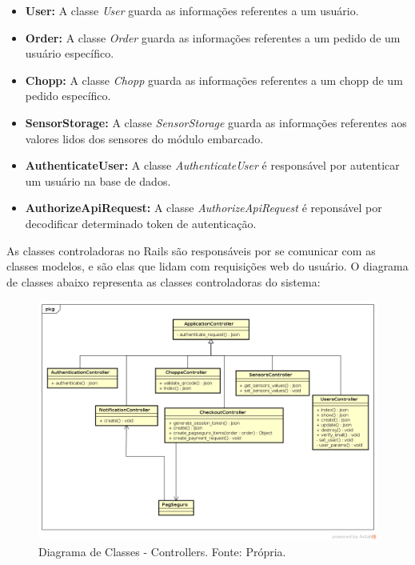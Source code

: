\begin{itemize}
    \item \textbf{User:} A classe \textit{User} guarda as informações referentes a um usuário.
    \item \textbf{Order:} A classe \textit{Order} guarda as informações referentes a um pedido
    de um usuário específico. 
    \item \textbf{Chopp:} A classe \textit{Chopp} guarda as informações referentes a um chopp
    de um pedido específico.
    \item \textbf{SensorStorage:} A classe \textit{SensorStorage} guarda as informações referentes
    aos valores lidos dos sensores do módulo embarcado.
    \item \textbf{AuthenticateUser:} A classe \textit{AuthenticateUser} é responsável por autenticar um usuário
    na base de dados.
    \item \textbf{AuthorizeApiRequest:} A classe \textit{AuthorizeApiRequest} é reponsável por 
    decodificar determinado token de autenticação.
\end{itemize}


As classes controladoras no Rails são responsáveis por se comunicar com as classes modelos, e são elas que lidam com
requisições web do usuário. O diagrama de classes abaixo representa as classes controladoras do sistema:

\begin{figure}[H]
    \centering
    \includegraphics[scale= 0.5]{figuras/diagrama-controllers.png}
    \caption{Diagrama de Classes - Controllers. Fonte: Própria.}
    \label{modelagem}
\end{figure}

